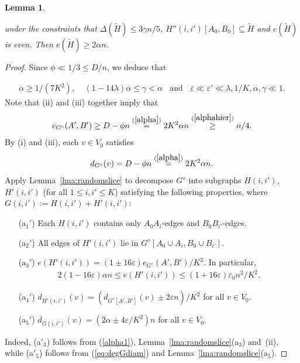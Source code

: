 \documentclass{memo-l}
\newtheorem{lemma}[firstthm]{Lemma}
\def\COMMENT#1{}
\def\eps{\varepsilon}
\def\epszero{\eps_0}
\numberwithin{section}{chapter}
\numberwithin{equation}{section}
\numberwithin{firstthm}{section}
\numberwithin{figure}{section}
\begin{document}
{\begin{lemma}
\begin{itemize}
under the constraints that $\Delta(\widetilde{H}) \le 3\gamma n /5$, $H''(i,i')[A_0,B_0] \subseteq \widetilde{H}$ and $e(\widetilde{H})$ is even.
Then $e(\widetilde{H}) \ge 2 \alpha n $.
\end{itemize}
\end{lemma}
\begin{proof}
Since $\phi  \ll 1/3\le D/n$, we deduce that%
    \COMMENT{$\gamma=\alpha -2\lambda/K^2\ge \alpha -2\lambda \cdot 7\alpha=(1-14\lambda)\alpha$}
\begin{align} \label{alphahier}
	\alpha \ge 1/(7K^2), \ \ \ \ \ (1-14\lambda)\alpha\le \gamma<\alpha \ \ \ \ \text{and} \ \ \ \ \eps \ll \eps'  \ll \lambda, 1/K,\alpha, \gamma \ll 1.
\end{align}
Note that (ii) and (iii) together imply that
\begin{align}	\label{alpha1}
e_{G^{\diamond}}(A',B') \ge D - \phi n \stackrel{(\ref{alpha})}{=}  2 K^2 \alpha n \stackrel{(\ref{alphahier})}{\ge } n/4.
\end{align}
By (i) and (iii), each $v \in V_0$ satisfies
\begin{equation}\label{eq:degGdiam}
d_{G^{\diamond}}(v) = D - \phi n \stackrel{(\ref{alpha})}{=} 2 K^2\alpha n.
\end{equation}
Apply Lemma~\ref{lma:randomslice} to decompose $G^{\diamond}$ into subgraphs $H(i,i')$, $H'(i,i')$ (for all $1\le i,i' \le K$)
satisfying the following properties, where $G(i,i'):=H(i,i')+H'(i,i')$:
\begin{itemize}
\item[(a$_1'$)] Each $H(i,i')$ contains only $A_0A_i$-edges and $B_0B_{i'}$-edges.
\item[(a$_2'$)] All edges of $H'(i,i')$ lie in $G^{\diamond}[A_0 \cup A_i, B_0 \cup B_{i'}]$.
\item[(a$_3'$)] $e ( H'(i,i') )   =   (1 \pm 16\eps)  e_{G^\diamond}(A',B') /K^2$.
	In particular, 
\begin{align*}
	 2 (1- 16\eps) \alpha n \le e(H'(i,i')) \le (1+16 \eps) \epszero n^2/K^2.
\end{align*}
\item[(a$_4'$)] $d_{H'(i,i')}(v )  =  ( d_{G^\diamond[A',B']}(v)  \pm 2 \eps n)/K^2$ for all $v \in V_0$.
\item[(a$_5'$)] $d_{G(i,i')}(v )  =  ( 2 \alpha  \pm 4 \eps/K^2)n$ for all $v \in V_0$.
\end{itemize}
Indeed, (a$'_3$) follows from (\ref{alpha1}), Lemma~\ref{lma:randomslice}(a$_3$) and~(ii),
while (a$'_5$) follows from (\ref{eq:degGdiam}) and Lemma~\ref{lma:randomslice}(a$_5$).

\end{proof}}
\end{document}
